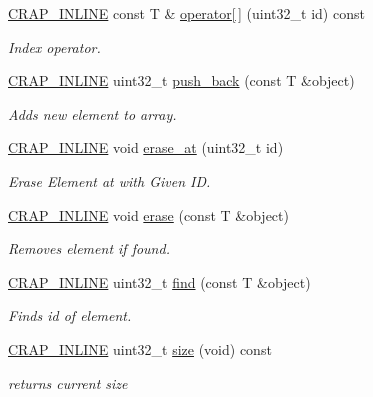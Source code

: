 \begin{DoxyCompactItemize}
\hyperlink{config__x86_8h_a5a40526b8d842e7ff731509998bb0f1c}{C\+R\+A\+P\+\_\+\+I\+N\+L\+I\+N\+E} const T \& \hyperlink{classcrap_1_1indexed__array_a8c32ee41e2657fbc65e7bd639ef46b77}{operator\mbox{[}$\,$\mbox{]}} (uint32\+\_\+t id) const 
\begin{DoxyCompactList}\small\item\em Index operator. \end{DoxyCompactList}\item 
\hyperlink{config__x86_8h_a5a40526b8d842e7ff731509998bb0f1c}{C\+R\+A\+P\+\_\+\+I\+N\+L\+I\+N\+E} uint32\+\_\+t \hyperlink{classcrap_1_1indexed__array_a89575aa1f42788edc2aab95297dcd6c0}{push\+\_\+back} (const T \&object)
\begin{DoxyCompactList}\small\item\em Adds new element to array. \end{DoxyCompactList}\item 
\hyperlink{config__x86_8h_a5a40526b8d842e7ff731509998bb0f1c}{C\+R\+A\+P\+\_\+\+I\+N\+L\+I\+N\+E} void \hyperlink{classcrap_1_1indexed__array_adb85b6576eab1ff1417ce7cb36623475}{erase\+\_\+at} (uint32\+\_\+t id)
\begin{DoxyCompactList}\small\item\em Erase Element at with Given I\+D. \end{DoxyCompactList}\item 
\hyperlink{config__x86_8h_a5a40526b8d842e7ff731509998bb0f1c}{C\+R\+A\+P\+\_\+\+I\+N\+L\+I\+N\+E} void \hyperlink{classcrap_1_1indexed__array_a3586220d147f590559c7bb69a331ab4b}{erase} (const T \&object)
\begin{DoxyCompactList}\small\item\em Removes element if found. \end{DoxyCompactList}\item 
\hyperlink{config__x86_8h_a5a40526b8d842e7ff731509998bb0f1c}{C\+R\+A\+P\+\_\+\+I\+N\+L\+I\+N\+E} uint32\+\_\+t \hyperlink{classcrap_1_1indexed__array_a51a6cc95bab591b58538787eafc86164}{find} (const T \&object)
\begin{DoxyCompactList}\small\item\em Finds id of element. \end{DoxyCompactList}\item 
\hyperlink{config__x86_8h_a5a40526b8d842e7ff731509998bb0f1c}{C\+R\+A\+P\+\_\+\+I\+N\+L\+I\+N\+E} uint32\+\_\+t \hyperlink{classcrap_1_1indexed__array_a1ac98bff03a0d2b8fafb5fde8102cf12}{size} (void) const 
\begin{DoxyCompactList}\small\item\em returns current size \end{DoxyCompactList}\item 

\end{DoxyCompactItemize}

